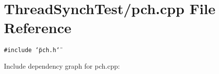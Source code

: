 \section{Thread\-Synch\-Test/pch.cpp File Reference}
\label{pch_8cpp}
{\tt \#include \char`\"{}pch.h\char`\"{}}\par


Include dependency graph for pch.cpp: